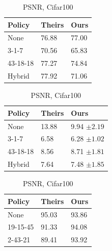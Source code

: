\begin{table}[h]
    \begin{subtable}{.50\linewidth}
        \centering
        {\begin{tabular}{|l|l l|}
             \hline
             \textbf{Policy} & \textbf{Theirs}   & \textbf{Ours}     \\\hline
             None            & 76.88             & 77.00             \\
             3-1-7           & \color{red} 70.56 & \color{red} 65.83 \\
             43-18-18        & 77.27             & 74.84             \\
             Hybrid          & \color{red} 77.92 & \color{red} 71.06 \\
             \hline
        \end{tabular}}
        \caption{Accuracy, Cifar100}\label{tab:1a}
    \end{subtable}%
    \hfill
    \begin{subtable}{.50\linewidth}
        \centering
        {\begin{tabular}{|l|l l |}
             \hline
             \textbf{Policy} & \textbf{Theirs}   & \textbf{Ours}              \\\hline
             None            & \color{red} 13.88 & \color{red} 9.94  $\pm 2.19$ \\
             3-1-7           & 6.58              & 6.28 $\pm 1.02$            \\
             43-18-18        & 8.56              & 8.71 $\pm 1.81 $           \\
             Hybrid          & 7.64              & 7.48  $\pm 1.85$             \\
             \hline
        \end{tabular}}
        \caption{PSNR, Cifar100}\label{tab:prs}
    \end{subtable}%
    \hfill
    \begin{subtable}{.50\linewidth}
        \centering
        {\begin{tabular}{|l|l l |}
             \hline
             \textbf{Policy} & \textbf{Theirs} & \textbf{Ours} \\\hline
             None            & 95.03           & 93.86         \\
             19-15-45        & 91.33           & 94.08         \\
             2-43-21         & 89.41           & 93.92         \\

\end{tabular}}
\end{subtable}
\end{table}

